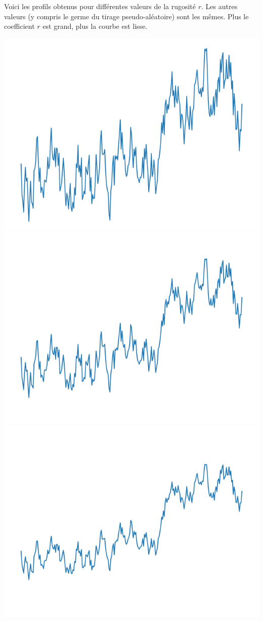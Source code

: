 \documentclass[11pt,class=report,crop=false]{standalone}
\begin{document}
\begin{exemple}
Voici les profils obtenus pour différentes valeurs de la rugosité $r$. 
Les autres valeurs (y compris le germe du tirage pseudo-aléatoire) sont les mêmes. Plus le coefficient $r$ est grand, plus la courbe est lisse.

\begin{center}
\includegraphics[scale=\myscale,scale=0.2]{figures/landscape-06-02}
\includegraphics[scale=\myscale,scale=0.2]{figures/landscape-06-03}
\includegraphics[scale=\myscale,scale=0.2]{figures/landscape-06-04}

\end{center}
\end{exemple}
\end{document}
